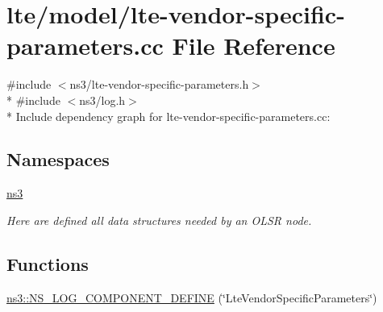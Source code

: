 \hypertarget{lte-vendor-specific-parameters_8cc}{}\section{lte/model/lte-\/vendor-\/specific-\/parameters.cc File Reference}
\label{lte-vendor-specific-parameters_8cc}
{\ttfamily \#include $<$ns3/lte-\/vendor-\/specific-\/parameters.\+h$>$}\\*
{\ttfamily \#include $<$ns3/log.\+h$>$}\\*
Include dependency graph for lte-\/vendor-\/specific-\/parameters.cc\+:
\subsection*{Namespaces}
\begin{DoxyCompactItemize}
\item 
 \hyperlink{namespacens3}{ns3}
\begin{DoxyCompactList}\small\item\em Here are defined all data structures needed by an O\+L\+SR node. \end{DoxyCompactList}\end{DoxyCompactItemize}
\subsection*{Functions}
\begin{DoxyCompactItemize}
\item 
\hyperlink{namespacens3_abd3e15f69e8b06523a476fe0afcede83}{ns3\+::\+N\+S\+\_\+\+L\+O\+G\+\_\+\+C\+O\+M\+P\+O\+N\+E\+N\+T\+\_\+\+D\+E\+F\+I\+NE} (\char`\"{}Lte\+Vendor\+Specific\+Parameters\char`\"{})
\end{DoxyCompactItemize}
